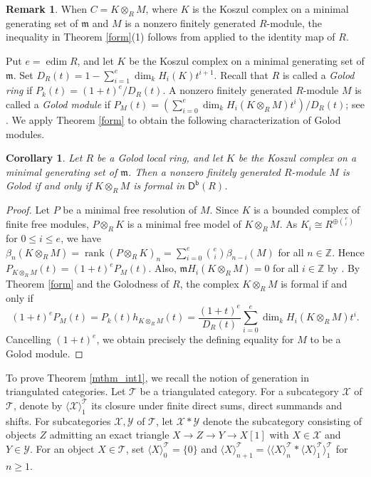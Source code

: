 \documentclass[10pt]{amsart}
\newtheorem{cor}[thm]{Corollary}
\theoremstyle{definition}
\newtheorem{rem}[thm]{Remark}
\theoremstyle{remark}
\numberwithin{equation}{thm}
\def\db{\operatorname{\mathsf{D^b}}}
\def\dim{\operatorname{dim}}
\def\edim{\operatorname{edim}}
\def\ge{\geqslant}
\def\le{\leqslant}
\def\m{\mathfrak{m}}
\def\T{\mathcal{T}}
\def\X{\mathcal{X}}
\def\Y{\mathcal{Y}}
\def\ZZ{\mathbb{Z}}
\begin{document}
\begin{rem}
When $C=K\otimes_R M$, where $K$ is the Koszul complex on a minimal generating set of $\m$ and $M$ is a nonzero finitely generated $R$-module, the inequality in Theorem \ref{form}(1) follows from \cite[Theorem 6.1.1]{AIM2006} applied to the identity map of $R$.
\end{rem}
Put $e=\edim R$, and let $K$ be the Koszul complex on a minimal generating set of $\m$. 
Set $D_R(t)=1-\sum_{i=1}^e\dim_k H_i(K)t^{i+1}$. 
Recall that $R$ is called a {\em Golod ring} if $P_k(t)=(1+t)^e/D_R(t)$.
A nonzero finitely generated $R$-module $M$ is called a {\em Golod module} if $P_M(t)=(\sum_{i=0}^e\dim_k H_i(K\otimes_R M)t^i)/D_R(t)$; see \cite[Section 5.3]{A1998}.
We apply Theorem \ref{form} to obtain the following characterization of Golod modules.
\begin{cor}\label{cor_golod}
Let $R$ be a Golod local ring, and let $K$ be the Koszul complex on a minimal generating set of $\m$. 
Then a nonzero finitely generated $R$-module $M$ is Golod if and only if $K\otimes_R M$ is formal in $\db(R)$.
\end{cor}
\begin{proof}
Let $P$ be a minimal free resolution of $M$. 
Since $K$ is a bounded complex of finite free modules, $P\otimes_R K$ is a minimal free model of $K\otimes_R M$. 
As $K_i\cong R^{\oplus\binom ei}$ for $0\le i\le e$, we have $\beta_n(K\otimes_R M)=\operatorname{rank}(P\otimes_R K)_n=\sum_{i=0}^e\binom ei\beta_{n-i}(M)$ for all $n\in\ZZ$.
Hence $P_{K\otimes_R M}(t)=(1+t)^eP_M(t)$.
Also, $\m H_i(K\otimes_R M)=0$ for all $i\in\ZZ$ by \cite[(1.5.3)]{AIM2006}.
By Theorem \ref{form} and the Golodness of $R$, the complex $K\otimes_R M$ is formal if and only if
\[
(1+t)^eP_M(t)=P_k(t)h_{K\otimes_R M}(t)=\frac{(1+t)^e}{D_R(t)}\sum_{i=0}^e\dim_k H_i(K\otimes_R M)t^i.
\]
Cancelling $(1+t)^e$, we obtain precisely the defining equality for $M$ to be a Golod module.
\end{proof}
To prove Theorem \ref{mthm_int1}, we recall the notion of generation in triangulated categories.
Let $\T$ be a triangulated category. 
For a subcategory $\X$ of $\T$, denote by $\langle\X\rangle_1^\T$ its closure under finite direct sums, direct summands and shifts. 
For subcategories $\X,\Y$ of $\T$, let $\X\ast\Y$ denote the subcategory consisting of objects $Z$ admitting an exact triangle $X\to Z\to Y\to X[1]$ with $X\in\X$ and $Y\in\Y$. 
For an object $X\in\T$, set $\langle X\rangle_0^\T=\{0\}$ and $\langle X\rangle_{n+1}^\T=\langle\langle X\rangle_n^\T\ast\langle X\rangle_1^\T\rangle_1^\T$ for $n\ge1$.
\end{document}

